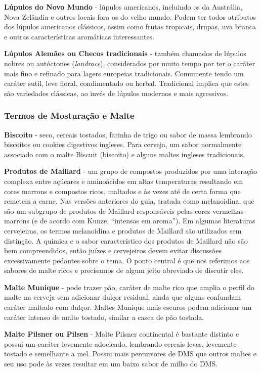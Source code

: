 \textbf{Lúpulos do Novo Mundo} - lúpulos americanos, incluindo os da Austrália, Nova Zelândia e outros locais fora os do velho mundo. Podem ter todos atributos dos lúpulos americanos clássicos, assim como frutas tropicais, drupas, uva branca e outras características aromáticas interessantes.

\textbf{Lúpulos Alemães ou Checos tradicionais} - também chamados de lúpulos nobres ou autóctones (\textit{landrace}), considerados por muito tempo por ter o caráter mais fino e refinado para lagers europeias tradicionais. Comumente tendo um caráter sutil, leve floral, condimentado ou herbal. Tradicional implica que estes são variedades clássicas, ao invés de lúpulos modernos e mais agressivos.
\subsubsection*{Termos de Mosturação e Malte}
\textbf{Biscoito} - seco, cereais tostados, farinha de trigo ou sabor de massa lembrando biscoitos ou cookies digestivos ingleses. Para cerveja, um sabor normalmente associado com o malte Biscuit (biscoito) e alguns maltes ingleses tradicionais.

\textbf{Produtos de Maillard} - um grupo de compostos produzidos por uma interação complexa entre açúcares e aminoácidos em altas temperaturas resultando em cores marrons e compostos ricos, maltados e às vezes até de certa forma que remetem a carne. Nas versões anteriores do guia, tratada como melanoidina, que são um subgrupo de produtos de Maillard responsáveis pelas cores vermelhas-marrons (e de acordo com Kunze, “intensas em aroma”). Em algumas literaturas cervejeiras, os termos melanoidina e produtos de Maillard são utilizados sem distinção. A química e o sabor característico dos produtos de Maillard não são bem compreendidos, então juízes e cervejeiros devem evitar discussões excessivamente pedantes sobre o tema. O ponto central é que nos referimos aos sabores de malte ricos e precisamos de algum jeito abreviado de discutir eles.

\textbf{Malte Munique} - pode trazer pão, caráter de malte rico que amplia o perfil do malte na cerveja sem adicionar dulçor residual, ainda que alguns confundam caráter maltado com dulçor. Maltes Munique mais escuros podem adicionar um caráter intenso de malte tostado, similar a casca de pão tostada.

\textbf{Malte Pilsner ou Pilsen} - Malte Pilsner continental é bastante distinto e possui um caráter levemente adocicado, lembrando cereais leves, levemente tostado e semelhante a mel. Possui mais percursores de DMS que outros maltes e seu uso pode às vezes resultar em um baixo sabor de milho do DMS.


